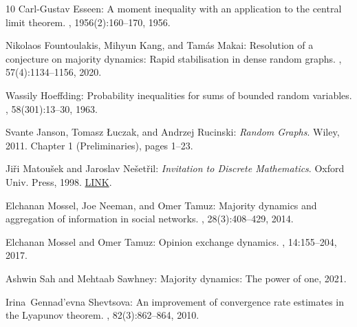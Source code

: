 \documentclass[11pt]{article}
\numberwithin{equation}{section}
\theoremstyle{definition}
\theoremstyle{plain}
\begin{document}
\begin{thebibliography}{10}
{\sc Carl-Gustav Esseen}: A moment inequality with an application to the
  central limit theorem.
, 1956(2):160--170, 1956.
\newblock [\epfmtdoi{10.1080/03461238.1956.10414946}]

{\sc Nikolaos Fountoulakis, Mihyun Kang, and Tamás Makai}: Resolution of a
  conjecture on majority dynamics: {R}apid stabilisation in dense random
  graphs.
, 57(4):1134--1156, 2020.

{\sc Wassily Hoeffding}: Probability inequalities for sums of bounded random
  variables.
, 58(301):13--30, 1963.
\newblock [\epfmtdoi{10.1080/01621459.1963.10500830}]

{\sc Svante Janson, Tomasz {\L}uczak, and Andrzej Rucinski}: {\em Random
  Graphs}.
\newblock Wiley, 2011.
\newblock Chapter 1 (Preliminaries), pages 1--23.
\newblock [\epfmtdoi{10.1002/9781118032718.ch1}]

{\sc Ji{\v r}i Matou{\v s}ek and Jaroslav Ne{\v s}et{\v r}il}: {\em Invitation
  to Discrete Mathematics}.
\newblock Oxford Univ. Press, 1998.
\newblock
  \href{https://global.oup.com/academic/product/invitation-to-discrete-mathematics-9780198570431?cc=il&lang=en&}{LINK}.

{\sc Elchanan Mossel, Joe Neeman, and Omer Tamuz}: Majority dynamics and
  aggregation of information in social networks.
, 28(3):408--429,
  2014.
\newblock [\epfmtdoi{10.1007/s10458-013-9230-4}]

{\sc Elchanan Mossel and Omer Tamuz}: Opinion exchange dynamics.
, 14:155--204, 2017.
\newblock [\epfmtdoi{10.1214/14-PS230}]

{\sc Ashwin Sah and Mehtaab Sawhney}: Majority dynamics: The power of one,
  2021.

{\sc Irina~Gennad'evna Shevtsova}: An improvement of convergence rate estimates
  in the {L}yapunov theorem.
, 82(3):862--864, 2010.
\newblock [\epfmtdoi{10.1134/S1064562410060062}]


\end{thebibliography}
\end{document}
